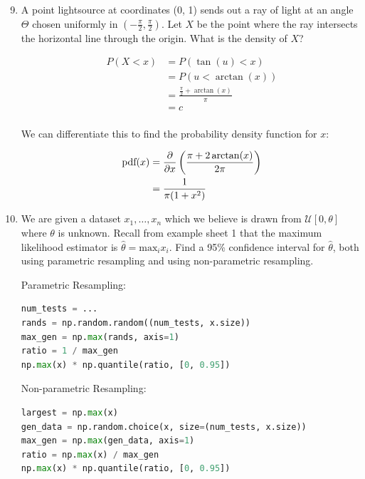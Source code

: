 \documentclass[10pt,\jkfside,a4paper]{article}
\begin{document}
\begin{enumerate}

\setcounter{enumi}{8}

\item A point lightsource at coordinates (0, 1) sends out a ray of light at
an angle $\Theta$ chosen uniformly in $ \left( -\frac{\pi}{2}, \frac{\pi}{2}
\right) $. Let $X$ be the point where the ray intersects the horizontal line
through the origin. What is the density of $X$?

\[
\begin{split}
P(X < x)
&= P(\tan(u) < x) \\
&= P(u < \arctan(x)) \\
&= \frac{\frac{\pi}{2} + \arctan(x)}{\pi} \\
&= c \\
\end{split}
\]

We can differentiate this to find the probability density function for $x$:

\[
\begin{split}
\text{pdf}(x)
&= \pdv{x}\left(\frac{\pi + 2\arctan(x)}{2\pi}\right) \\
&= \frac{1}{\pi(1 + x^2)}
\end{split}
\]


\item We are given a dataset $x_1, \dots, x_n$ which we believe is drawn
from $\mathcal{U}[0, \theta]$ where $\theta$ is unknown. Recall from example
sheet 1 that the maximum likelihood estimator is $\hat{\theta} = \text{max}_i
x_i$. Find a 95\% confidence interval for $\hat{\theta}$, both using
parametric resampling and using non-parametric resampling.

Parametric Resampling:

\begin{lstlisting}[language=Python]
num_tests = ...
rands = np.random.random((num_tests, x.size))
max_gen = np.max(rands, axis=1)
ratio = 1 / max_gen
np.max(x) * np.quantile(ratio, [0, 0.95])
\end{lstlisting}

Non-parametric Resampling:

\begin{lstlisting}[language=Python]
largest = np.max(x)
gen_data = np.random.choice(x, size=(num_tests, x.size))
max_gen = np.max(gen_data, axis=1)
ratio = np.max(x) / max_gen
np.max(x) * np.quantile(ratio, [0, 0.95])
\end{lstlisting}


\end{enumerate}
\end{document}

